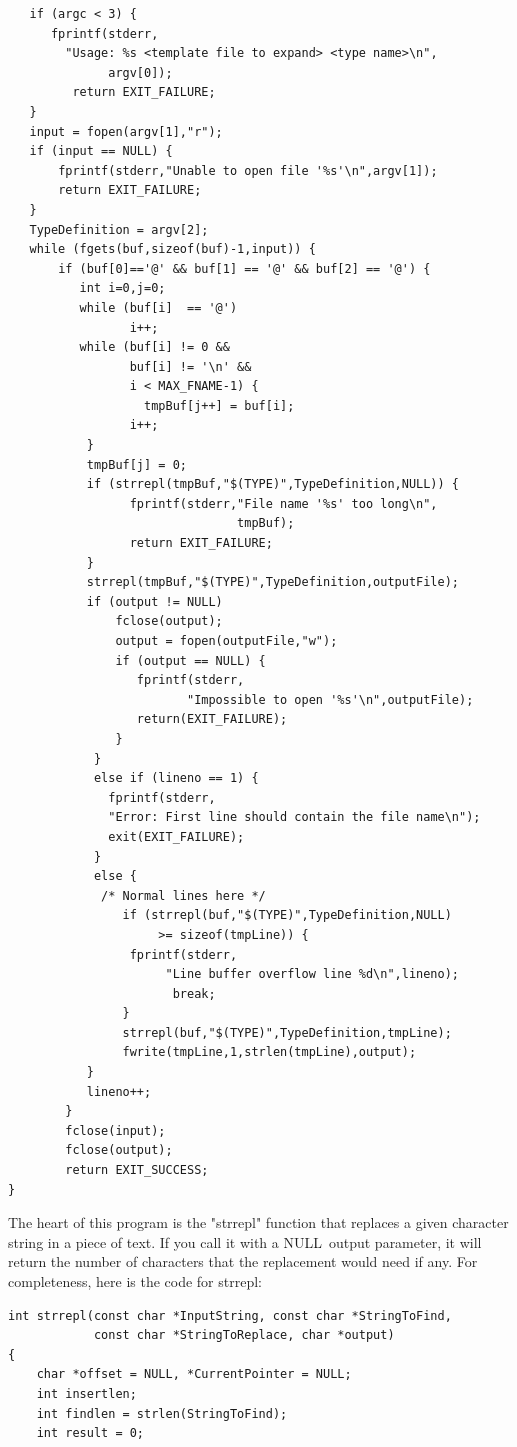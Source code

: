 \documentclass[12pt,a4paper]{memoir} %
\newif\iftth
\newcommand{\Null}{{\iftth \ NULL \else \footnotesize NULL\  \fi}}
\begin{document}
{{\begin{verbatim}
   if (argc < 3) {
      fprintf(stderr,
        "Usage: %s <template file to expand> <type name>\n",
              argv[0]);
         return EXIT_FAILURE;
   }
   input = fopen(argv[1],"r");
   if (input == NULL) {
       fprintf(stderr,"Unable to open file '%s'\n",argv[1]);
       return EXIT_FAILURE;
   }
   TypeDefinition = argv[2];
   while (fgets(buf,sizeof(buf)-1,input)) {
       if (buf[0]=='@' && buf[1] == '@' && buf[2] == '@') {
          int i=0,j=0;
          while (buf[i]  == '@')
                 i++;
          while (buf[i] != 0 && 
                 buf[i] != '\n' && 
                 i < MAX_FNAME-1) {
                   tmpBuf[j++] = buf[i];
                 i++;
           }
           tmpBuf[j] = 0;
           if (strrepl(tmpBuf,"$(TYPE)",TypeDefinition,NULL)) {
                 fprintf(stderr,"File name '%s' too long\n",
                                tmpBuf);
                 return EXIT_FAILURE;
           }
           strrepl(tmpBuf,"$(TYPE)",TypeDefinition,outputFile);
           if (output != NULL)
               fclose(output);
               output = fopen(outputFile,"w");
               if (output == NULL) {
                  fprintf(stderr,
                         "Impossible to open '%s'\n",outputFile);
                  return(EXIT_FAILURE);
               }
            }
            else if (lineno == 1) {
              fprintf(stderr,
              "Error: First line should contain the file name\n");
              exit(EXIT_FAILURE);
            }
            else {
             /* Normal lines here */
                if (strrepl(buf,"$(TYPE)",TypeDefinition,NULL) 
                     >= sizeof(tmpLine)) {
                 fprintf(stderr,
                      "Line buffer overflow line %d\n",lineno);
                       break;
                }
                strrepl(buf,"$(TYPE)",TypeDefinition,tmpLine);
                fwrite(tmpLine,1,strlen(tmpLine),output);
           }
           lineno++;
        }
        fclose(input);
        fclose(output);
        return EXIT_SUCCESS;
}
\end{verbatim}
The heart of this program is the "strrepl" function that replaces a given character string in a piece of text. If you call it with a \Null output parameter, it will return the number of characters that the replacement would need if any. For completeness, here is the code for strrepl:
\begin{verbatim}
int strrepl(const char *InputString, const char *StringToFind,
            const char *StringToReplace, char *output)
{
    char *offset = NULL, *CurrentPointer = NULL;
    int insertlen;
    int findlen = strlen(StringToFind);
    int result = 0;


\end{verbatim}}}
\end{document}
